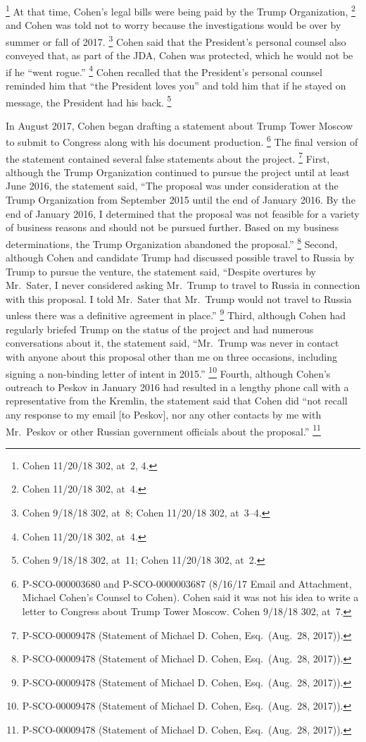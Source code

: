 \footnote{Cohen 11/20/18 302, at~2, 4.}
At that time, Cohen's legal bills were being paid by the Trump Organization,%
\footnote{Cohen 11/20/18 302, at~4.}
and Cohen was told not to worry because the investigations would be over by summer or fall of 2017.%
\footnote{Cohen 9/18/18 302, at~8;
Cohen 11/20/18 302, at~3--4.}
Cohen said that the President's personal counsel also conveyed that, as part of the JDA, Cohen was protected, which he would not be if he ``went rogue.''%
\footnote{Cohen 11/20/18 302, at~4.}
Cohen recalled that the President's personal counsel reminded him that ``the President loves you'' and told him that if he stayed on message, the President had his back.%
\footnote{Cohen 9/18/18 302, at~11;
Cohen 11/20/18 302, at~2.}

In August 2017, Cohen began drafting a statement about Trump Tower Moscow to submit to Congress along with his document production.%
\footnote{P-SCO-000003680 and P-SCO-0000003687 (8/16/17 Email and Attachment, Michael Cohen's Counsel to Cohen).
Cohen said it was not his idea to write a letter to Congress about Trump Tower Moscow.
Cohen 9/18/18 302, at~7.}
The final version of the statement contained several false statements about the project.%
\footnote{P-SCO-00009478 (Statement of Michael D. Cohen, Esq.\ (Aug.~28, 2017)).}
First, although the Trump Organization continued to pursue the project until at least June 2016, the statement said, ``The proposal was under consideration at the Trump Organization from September 2015 until the end of January 2016.
By the end of January 2016, I determined that the proposal was not feasible for a variety of business reasons and should not be pursued further.
Based on my business determinations, the Trump Organization abandoned the proposal.''%
\footnote{P-SCO-00009478 (Statement of Michael D. Cohen, Esq.\ (Aug.~28, 2017)).}
Second, although Cohen and candidate Trump had discussed possible travel to Russia by Trump to pursue the venture, the statement said, ``Despite overtures by Mr.~Sater, I never considered asking Mr.~Trump to travel to Russia in connection with this proposal.
I told Mr.~Sater that Mr.~Trump would not travel to Russia unless there was a definitive agreement in place.''%
\footnote{P-SCO-00009478 (Statement of Michael D. Cohen, Esq.\ (Aug.~28, 2017)).}
Third, although Cohen had regularly briefed Trump on the status of the project and had numerous conversations about it, the statement said, ``Mr.~Trump was never in contact with anyone about this proposal other than me on three occasions, including signing a non-binding letter of intent in 2015.''%
\footnote{P-SCO-00009478 (Statement of Michael D. Cohen, Esq.\ (Aug.~28, 2017)).}
Fourth, although Cohen's outreach to Peskov in January 2016 had resulted in a lengthy phone call with a representative from the Kremlin, the statement said that Cohen did ``not recall any response to my email [to Peskov], nor any other contacts by me with Mr.~Peskov or other Russian government officials about the proposal.''%
\footnote{P-SCO-00009478 (Statement of Michael D. Cohen, Esq.\ (Aug.~28, 2017)).}

